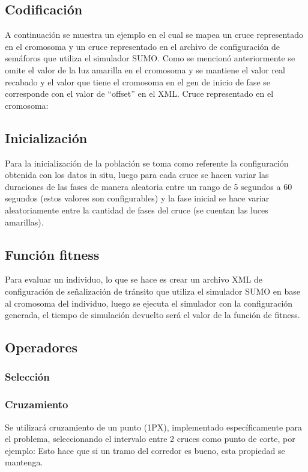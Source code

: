 \subsection{Codificación} 
A continuación se muestra un ejemplo en el cual se mapea un
cruce representado en el cromosoma y un cruce representado
en  el  archivo  de  configuración  de  semáforos  que  utiliza  el
simulador SUMO.
Como se  mencionó anteriormente se omite el valor de la luz
amarilla en el cromosoma y se mantiene el valor real recabado
y el valor que tiene el cromosoma en el gen de inicio de fase
se corresponde con el valor de “offset” en el XML.
Cruce representado en el cromosoma:

\subsection{Inicialización}
Para la inicialización de la población se toma como referente
la configuración obtenida con los datos in situ, luego para cada
cruce  se  hacen  variar  las  duraciones  de  las  fases  de  manera
aleatoria  entre  un  rango  de  5  segundos  a  60  segundos  (estos
valores  son  configurables)  y  la  fase  inicial  se  hace  variar
aleatoriamente entre la cantidad de fases del cruce  (se cuentan
las luces amarillas).

\subsection{Función fitness}
Para evaluar un individuo, lo que se hace es crear un archivo
XML  de configuración de señalización de tránsito que utiliza
el  simulador  SUMO  en  base  al  cromosoma  del  individuo,
luego se ejecuta el simulador con la configuración generada, el
tiempo de simulación devuelto será el valor de la función de
fitness.

\subsection{Operadores}
\subsubsection{Selección}
\subsubsection{Cruzamiento}
Se  utilizará  cruzamiento  de  un  punto  (1PX),  implementado
específicamente  para  el  problema,  seleccionando  el  intervalo
entre 2 cruces como punto de corte, por ejemplo:
Esto  hace  que  si  un  tramo  del  corredor  es  bueno,  esta
propiedad se mantenga.

